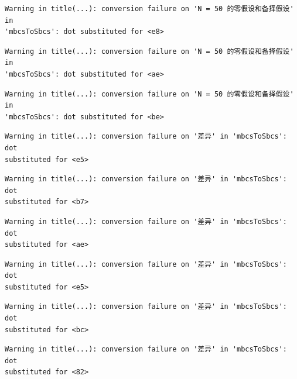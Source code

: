 \documentclass[
  letterpaper,
  DIV=11,
  numbers=noendperiod]{scrreprt}
\begin{document}
\begin{verbatim}
Warning in title(...): conversion failure on 'N = 50 的零假设和备择假设' in
'mbcsToSbcs': dot substituted for <e8>
\end{verbatim}

\begin{verbatim}
Warning in title(...): conversion failure on 'N = 50 的零假设和备择假设' in
'mbcsToSbcs': dot substituted for <ae>
\end{verbatim}

\begin{verbatim}
Warning in title(...): conversion failure on 'N = 50 的零假设和备择假设' in
'mbcsToSbcs': dot substituted for <be>
\end{verbatim}

\begin{verbatim}
Warning in title(...): conversion failure on '差异' in 'mbcsToSbcs': dot
substituted for <e5>
\end{verbatim}

\begin{verbatim}
Warning in title(...): conversion failure on '差异' in 'mbcsToSbcs': dot
substituted for <b7>
\end{verbatim}

\begin{verbatim}
Warning in title(...): conversion failure on '差异' in 'mbcsToSbcs': dot
substituted for <ae>
\end{verbatim}

\begin{verbatim}
Warning in title(...): conversion failure on '差异' in 'mbcsToSbcs': dot
substituted for <e5>
\end{verbatim}

\begin{verbatim}
Warning in title(...): conversion failure on '差异' in 'mbcsToSbcs': dot
substituted for <bc>
\end{verbatim}

\begin{verbatim}
Warning in title(...): conversion failure on '差异' in 'mbcsToSbcs': dot
substituted for <82>
\end{verbatim}
\end{document}
